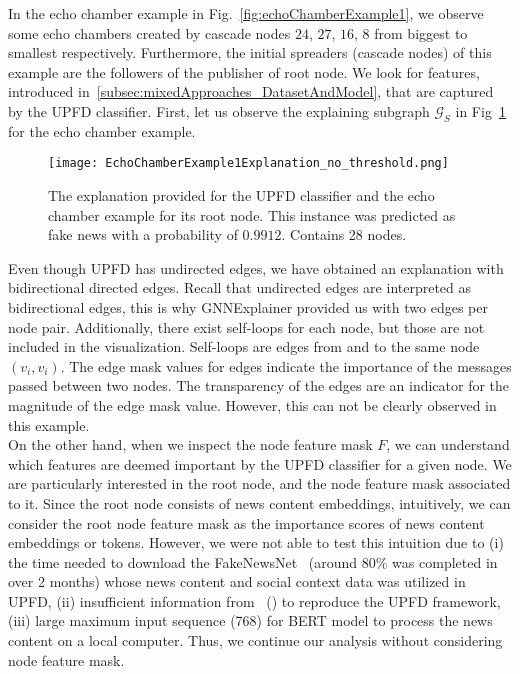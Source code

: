 In the echo chamber example in Fig.~\ref{fig:echoChamberExample1}, we observe some echo chambers created by cascade nodes $24$, $27$, $16$, $8$ from biggest to smallest respectively. Furthermore, the initial spreaders (cascade nodes) of this example are the followers of the publisher of root node. We look for features, introduced in~\ref{subsec:mixedApproaches_DatasetAndModel}, that are captured by the UPFD classifier. First, let us observe the explaining subgraph $\mathcal{G}_S$ in Fig~\ref{fig:EchoChamberExample1Explanation_no_threshold} for the echo chamber example.\\
\begin{figure}
    \centering
    \texttt{[image: EchoChamberExample1Explanation\_no\_threshold.png]}
    \caption[Echo chamber example explanation for root node.]{The explanation provided for the UPFD classifier and the echo chamber example for its root node. This instance was predicted as fake news with a probability of $0.9912$. Contains 28 nodes.}
    \label{fig:EchoChamberExample1Explanation_no_threshold}
\end{figure}
Even though UPFD has undirected edges, we have obtained an explanation with bidirectional directed edges. Recall that undirected edges are interpreted as bidirectional edges, this is why GNNExplainer provided us with two edges per node pair. Additionally, there exist self-loops for each node, but those are not included in the visualization. Self-loops are edges from and to the same node $(v_i, v_i)$. The edge mask values for edges indicate the importance of the messages passed between two nodes. The transparency of the edges are an indicator for the magnitude of the edge mask value. However, this can not be clearly observed in this example.\\
On the other hand, when we inspect the node feature mask $F$, we can understand which features are deemed important by the UPFD classifier for a given node. We are particularly interested in the root node, and the node feature mask associated to it. Since the root node consists of news content embeddings, intuitively, we can consider the root node feature mask as the importance scores of news content embeddings or tokens. However, we were not able to test this intuition due to (i) the time needed to download the FakeNewsNet~\parencite{FakeNewsNet_Shu} (around 80\% was completed in over 2 months) whose news content and social context data was utilized in UPFD, (ii) insufficient information from~\citeauthor{UPFD_Dataset_Shu} (\citeyear{UPFD_Dataset_Shu}) to reproduce the UPFD framework, (iii) large maximum input sequence (768) for BERT model to process the news content on a local computer. Thus, we continue our analysis without considering node feature mask. \\
